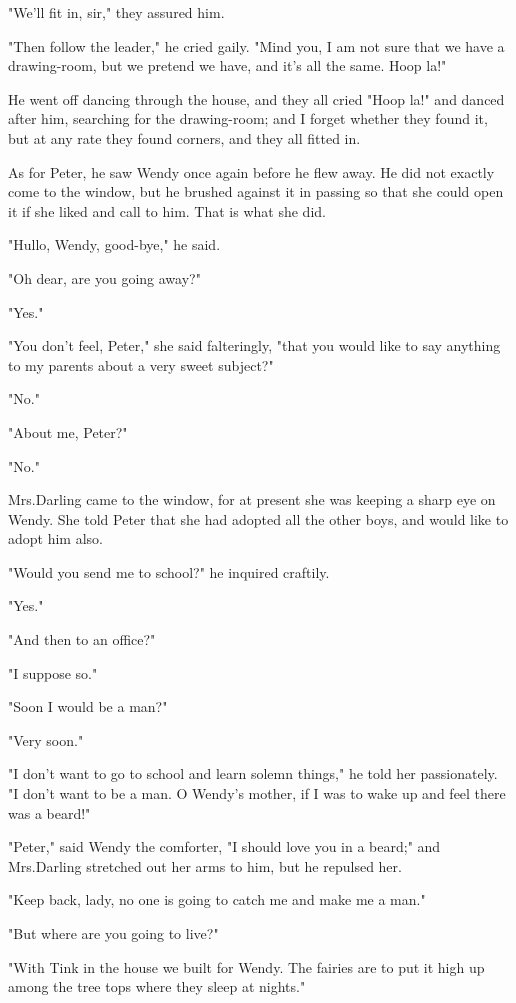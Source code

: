 "We'll fit in, sir," they assured him.

"Then follow the leader," he cried gaily.
"Mind you, I am not sure that we have a drawing-room,
but we pretend we have, and it's all the same.
Hoop la!"

He went off dancing through the house,
and they all cried "Hoop la!\@" and danced after him,
searching for the drawing-room;
and I forget whether they found it,
but at any rate they found corners, and they all fitted in.

As for Peter, he saw Wendy once again before he flew away.
He did not exactly come to the window,
but he brushed against it in passing so that she could open it if she liked and call to him.
That is what she did.

"Hullo, Wendy, good-bye," he said.

"Oh dear, are you going away?"

"Yes."

"You don't feel, Peter," she said falteringly,
"that you would like to say anything to my parents about a very sweet subject?"

"No."

"About me, Peter?"

"No."

Mrs.\@ Darling came to the window,
for at present she was keeping a sharp eye on Wendy.
She told Peter that she had adopted all the other boys,
and would like to adopt him also.

"Would you send me to school?\@" he inquired craftily.

"Yes."

"And then to an office?"

"I suppose so."

"Soon I would be a man?"

"Very soon."

"I don't want to go to school and learn solemn things,"
he told her passionately.
"I don't want to be a man.
O Wendy's mother, if I was to wake up and feel there was a beard!"

"Peter," said Wendy the comforter, "I should love you in a beard;"
and Mrs.\@ Darling stretched out her arms to him, but he repulsed her.

"Keep back, lady, no one is going to catch me and make me a man."

"But where are you going to live?"

"With Tink in the house we built for Wendy.
The fairies are to put it high up among the tree tops where they sleep at nights."

